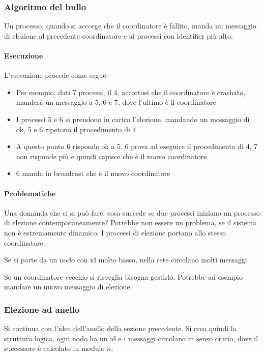 \subsubsection{Algoritmo del bullo}
Un processo, quando si accorge che il coordinatore 
è fallito, manda un messaggio di elezione 
al precedente coordinatore e ai processi con identifier più alto.

\paragraph{Esecuzione}
L'esecuzione procede come segue 
\begin{itemize}
    \item Per esempio, dati 7 processi, il 4, accortosi che il coordinatore 
    è crashato, manderà un messaggio a 5, 6 e 7, dove l'ultimo è il coordinatore
    \item I processi 5 e 6 si prendono in carico l'elezione, 
    mandando un messaggio di ok, 5 e 6 ripetono il procedimento 
    di 4
    \item A questo punto 6 risponde ok a 5.
    6 prova ad eseguire il procedimento di 4, 7 non risponde più
    e quindi capisce che è il nuovo coordinatore
    \item 6 manda in broadcast che è il nuovo coordinatore
\end{itemize}

\paragraph{Problematiche}
Una domanda che ci si può fare, cosa succede se due processi 
iniziano un processo di elezione contemporaneamente?
Potrebbe non essere un problema, se il sistema non è estremamente 
dinamico. I processi di elezione portano allo stesso coordinatore.

Se si parte da un nodo con id molto basso, nella rete circolano 
molti messaggi.

Se un coordinatore vecchio si risveglia bisogna gestirlo. Potrebbe ad 
esempio mandare un nuovo messaggio di elezione.

\subsubsection{Elezione ad anello}

Si continua con l'idea dell'anello della sezione precedente.
Si crea quindi la struttura logica, ogni nodo ha un id e i messaggi 
circolano in senso orario, dove il successore è calcolato in modulo 
$n$.

